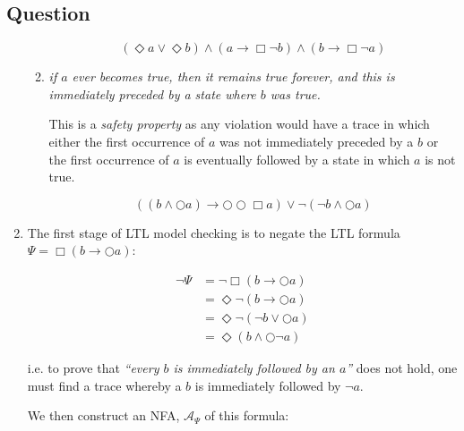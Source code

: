 \documentclass[12pt,a4paper]{article}
\newcounter{question}\setcounter{question}{1}
\newenvironment{question}{%
\subsection*{Question \arabic{question}}}%
{\stepcounter{question}}
\begin{document}
\begin{question}
\begin{enumerate}[label= (\alph*)]
\begin{enumerate}[label= (\roman*)]
                  \[
                  (\Diamond a \vee \Diamond b) \wedge (a \rightarrow \Box \neg b) \wedge (b \rightarrow \Box \neg a)
                  \]

            \item
                  \textit{if $a$ ever becomes true, then it remains true forever, and this is immediately preceded by a state where $b$ was true.}


                  This is a \textit{safety property}  as any violation would have a trace in which either the first occurrence of $a$ was not immediately preceded by a $b$ or the first occurrence of $a$ is eventually followed by a state in which $a$ is not true.

                  \[
                  ((b \wedge \bigcirc a ) \rightarrow \bigcirc \bigcirc \Box a) \vee \neg (\neg b \wedge \bigcirc a)
                  \]

          \end{enumerate}
    \item
          The first stage of LTL model checking is to negate the LTL formula $\Psi = \Box(b \rightarrow \bigcirc a)$:

          \begin{align*}
            \neg \Psi &= \neg\Box(b \rightarrow \bigcirc a) \\
                &= \Diamond \neg( b \rightarrow \bigcirc a ) \\
                &= \Diamond \neg (\neg b \vee \bigcirc a)\\
                &= \Diamond ( b \wedge \bigcirc \neg a )
          \end{align*}

          i.e. to prove that \textit{``every $b$ is immediately followed by an $a$''} does not hold, one must find a trace whereby a $b$ is immediately followed by $\neg a$.

          We then construct an NFA, $\mathcal{A}_{\Psi}$ of this formula:

          \begin{center}
          \end{center}



\end{enumerate}
\end{question}
\end{document}
